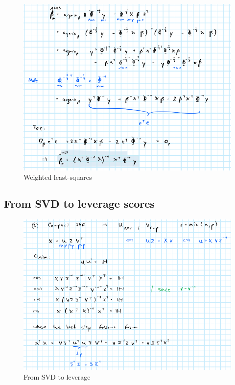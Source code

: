 \documentclass[
]{book}
\begin{document}
\begin{figure}
\centering
\includegraphics{www/wls.png}
\caption{Weighted least-squares}
\end{figure}

\hypertarget{app-svd}{%
\subsection*{From SVD to leverage scores}\label{app-svd}}

\begin{figure}
\centering
\includegraphics{www/svd_leverage.png}
\caption{From SVD to leverage}
\end{figure}
\end{document}

